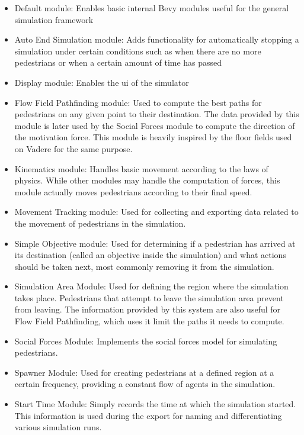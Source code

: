 \documentclass[twoside, 11pt]{article}
\begin{document}
\begin{itemize}
  \item Default module: Enables basic internal Bevy modules useful for the general simulation framework
  \item Auto End Simulation module: Adds functionality for automatically stopping a simulation under certain conditions such as when there are no more pedestrians or when a certain amount of time has passed
  \item Display module: Enables the \gls{ui} of the simulator
  \item Flow Field Pathfinding module: Used to compute the best paths for pedestrians on any given point to their destination. The data provided by this module is later used by the Social Forces module to compute the direction of the motivation force. This module is heavily inspired by the floor fields used on Vadere for the same purpose.
  \item Kinematics module: Handles basic movement according to the laws of physics. While other modules may handle the computation of forces, this module actually moves pedestrians according to their final speed.
  \item Movement Tracking module: Used for collecting and exporting data related to the movement of pedestrians in the simulation.
  \item Simple Objective module: Used for determining if a pedestrian has arrived at its destination (called an objective inside the simulation) and what actions should be taken next, most commonly removing it from the simulation.
  \item Simulation Area Module: Used for defining the region where the simulation takes place. Pedestrians that attempt to leave the simulation area prevent from leaving. The information provided by this system are also useful for Flow Field Pathfinding, which uses it limit the paths it needs to compute.
  \item Social Forces Module: Implements the social forces model for simulating pedestrians.
  \item Spawner Module: Used for creating pedestrians at a defined region at a certain frequency, providing a constant flow of agents in the simulation.
  \item Start Time Module: Simply records the time at which the simulation started. This information is used during the export for naming and differentiating various simulation runs.
\end{itemize}
\end{document}

